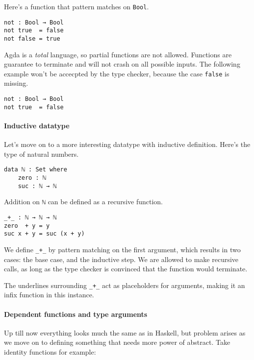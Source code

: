 \documentclass[12pt, a4paper]{article}
\begin{document}
Here's a function that pattern matches on {\lstinline|Bool|}.

\begin{lstlisting}
not : Bool → Bool
not true  = false
not false = true
\end{lstlisting}

Agda is a \textit{total} language, so partial functions are not allowed. Functions
are guarantee to terminate and will not crash on all possible inputs. The following
example won't be accecpted by the type checker, because the case {\lstinline|false|} is missing.

\begin{lstlisting}
not : Bool → Bool
not true  = false
\end{lstlisting}

\paragraph{Inductive datatype} Let's move on to a more interesting datatype with inductive definition. Here's the type of natural numbers.
\begin{lstlisting}
data ℕ : Set where
    zero : ℕ
    suc : ℕ → ℕ
\end{lstlisting}

Addition on {\lstinline|ℕ|} can be defined as a recursive function.

\begin{lstlisting}
_+_ : ℕ → ℕ → ℕ
zero  + y = y
suc x + y = suc (x + y)
\end{lstlisting}

We define {\lstinline|_+_|} by pattern matching on the first argument, which results
in two cases: the base case, and the inductive step. We are allowed to make
recursive calls, as long as the type checker is convinced that the function
would terminate.

The underlines surrounding {\lstinline|_+_|} act as placeholders for arguments, making
it an infix function in this instance.

\paragraph{Dependent functions and type arguments}
Up till now everything looks much the same as in Haskell, but problem arises as
we move on to defining something that needs more power of abstract. Take identity
functions for example:
\end{document}
